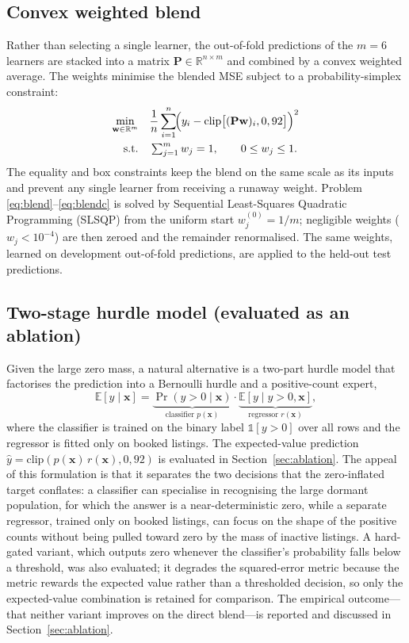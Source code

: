 \documentclass[journal]{IEEEtran}
\begin{document}
\subsection{Convex weighted blend}
Rather than selecting a single learner, the out-of-fold predictions of the $m=6$
learners are stacked into a matrix $\mathbf P\in\mathbb R^{n\times m}$ and combined
by a convex weighted average. The weights minimise the blended MSE subject to a
probability-simplex constraint:
\begin{align}
\min_{\mathbf w\in\mathbb R^{m}}\quad
&\frac{1}{n}\sum_{i=1}^{n}\!\Bigl(y_i-\mathrm{clip}\bigl[(\mathbf P\mathbf w)_i,0,92\bigr]\Bigr)^2
\label{eq:blend}\\
\text{s.t.}\quad &\textstyle\sum_{j=1}^{m}w_j=1,\qquad 0\le w_j\le 1.
\label{eq:blendc}
\end{align}
The equality and box constraints keep the blend on the same scale as its inputs
and prevent any single learner from receiving a runaway weight. Problem
\eqref{eq:blend}--\eqref{eq:blendc} is solved by Sequential Least-Squares
Quadratic Programming (SLSQP) from the uniform start $w_j^{(0)}=1/m$; negligible
weights ($w_j<10^{-4}$) are then zeroed and the remainder renormalised. The same
weights, learned on development out-of-fold predictions, are applied to the
held-out test predictions.

\subsection{Two-stage hurdle model (evaluated as an ablation)}
Given the large zero mass, a natural alternative is a two-part hurdle model that
factorises the prediction into a Bernoulli hurdle and a positive-count expert,
\begin{equation}
\mathbb E[y\mid\mathbf x]=\underbrace{\Pr(y>0\mid\mathbf x)}_{\text{classifier }p(\mathbf x)}
\cdot
\underbrace{\mathbb E[y\mid y>0,\mathbf x]}_{\text{regressor }r(\mathbf x)},
\label{eq:hurdle}
\end{equation}
where the classifier is trained on the binary label $\mathbb 1[y>0]$ over all rows
and the regressor is fitted only on booked listings. The expected-value prediction
$\hat y=\mathrm{clip}(p(\mathbf x)\,r(\mathbf x),0,92)$ is evaluated in
Section~\ref{sec:ablation}. The appeal of this formulation is that it separates the
two decisions that the zero-inflated target conflates: a classifier can specialise
in recognising the large dormant population, for which the answer is a
near-deterministic zero, while a separate regressor, trained only on booked
listings, can focus on the shape of the positive counts without being pulled toward
zero by the mass of inactive listings. A hard-gated variant, which outputs zero
whenever the classifier's probability falls below a threshold, was also evaluated;
it degrades the squared-error metric because the metric rewards the expected value
rather than a thresholded decision, so only the expected-value combination is
retained for comparison. The empirical outcome---that neither variant improves on
the direct blend---is reported and discussed in Section~\ref{sec:ablation}.
\end{document}
